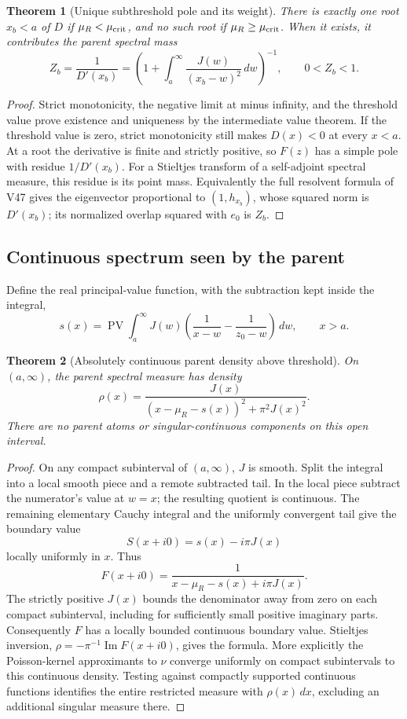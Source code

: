 \documentclass[11pt]{article}
\newtheorem{theorem}{Theorem}[section]
\theoremstyle{remark}
\begin{document}
\begin{theorem}[Unique subthreshold pole and its weight]
\label{thm:v20v48-bound}
There is exactly one root \(x_b<a\) of \(D\) if
\(\mu_R<\mu_{\rm crit}\), and no such root if
\(\mu_R\geq\mu_{\rm crit}\).  When it exists, it contributes
the parent spectral mass
\[
 Z_b=\frac1{D'(x_b)}
 =\left(1+\int_a^\infty\frac{J(w)}{(x_b-w)^2}\,dw\right)^{-1},
 \qquad 0<Z_b<1.
\]
\end{theorem}
\begin{proof}
Strict monotonicity, the negative limit at minus infinity, and
the threshold value prove existence and uniqueness by the
intermediate value theorem.  If the threshold value is zero,
strict monotonicity still makes \(D(x)<0\) at every \(x<a\).
At a root the derivative is finite and strictly positive, so
\(F(z)\) has a simple pole with residue \(1/D'(x_b)\).
For a Stieltjes transform of a self-adjoint spectral measure,
this residue is its point mass.  Equivalently the full resolvent
formula of V47 gives the eigenvector proportional to
\((1,h_{x_b})\), whose squared norm is \(D'(x_b)\);
its normalized overlap squared with \(e_0\) is \(Z_b\).
\end{proof}

\subsection{Continuous spectrum seen by the parent}

Define the real principal-value function, with the subtraction kept
inside the integral,
\[
 s(x)=\operatorname{PV}\int_a^\infty J(w)
 \left(\frac1{x-w}-\frac1{z_0-w}\right)\,dw,\qquad x>a.
\]

\begin{theorem}[Absolutely continuous parent density above threshold]
\label{thm:v20v48-ac}
On \((a,\infty)\), the parent spectral measure has density
\[
 \rho(x)=
 \frac{J(x)}
 {(x-\mu_R-s(x))^2+\pi^2J(x)^2}.
\]
There are no parent atoms or singular-continuous components on
this open interval.
\end{theorem}
\begin{proof}
On any compact subinterval of \((a,\infty)\), \(J\) is smooth.
Split the integral into a local smooth piece and a remote
subtracted tail.  In the local piece subtract the numerator's
value at \(w=x\); the resulting quotient is continuous.
The remaining elementary Cauchy integral and the uniformly
convergent tail give the boundary value
\[
 S(x+i0)=s(x)-i\pi J(x)
\]
locally uniformly in \(x\).  Thus
\[
 F(x+i0)=\frac1{x-\mu_R-s(x)+i\pi J(x)}.
\]
The strictly positive \(J(x)\) bounds the denominator away
from zero on each compact subinterval, including for sufficiently
small positive imaginary parts.  Consequently \(F\) has a
locally bounded continuous boundary value.  Stieltjes inversion,
\(\rho=-\pi^{-1}\operatorname{Im}F(x+i0)\), gives the formula.
More explicitly the Poisson-kernel approximants to \(\nu\)
converge uniformly on compact subintervals to this continuous
density.  Testing against compactly supported continuous functions
identifies the entire restricted measure with \(\rho(x)\,dx\),
excluding an additional singular measure there.
\end{proof}
\end{document}
